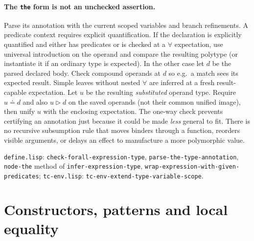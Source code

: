 \documentclass[11pt]{article}
\theoremstyle{definition}
\newcommand{\code}[1]{\texttt{#1}}
\newcommand{\src}[1]{\nolinkurl{#1}}
\newcommand{\eqs}{\doteq}
\newcommand{\oneway}{\mathrel{\triangleright}}
\begin{document}
\paragraph{The \code{the} form is not an unchecked assertion.}
Parse its annotation with the current scoped variables and branch
refinements. A predicate context requires explicit quantification. If
the declaration is explicitly quantified and either has predicates or is
checked at a $\forall$ expectation, use universal introduction on the
operand and compare the resulting
polytype (or instantiate it if an ordinary type is expected). In the
other case let $d$ be the parsed declared body. Check compound operands at
$d$ so e.g.\ a match sees its expected result. Simple leaves without
nested $\forall$ are inferred at a fresh result-capable expectation.
Let $u$ be the resulting \emph{substituted} operand type. Require
$u\eqs d$ and also $u\oneway d$ on the saved operands (not their common
unified image), then unify $u$ with the enclosing expectation. The
one-way check prevents certifying an annotation just because it could be
made \emph{less} general to fit. There is no recursive subsumption rule
that moves binders through a function, reorders visible arguments, or
delays an effect to manufacture a more polymorphic value.

\sources \src{define.lisp}: \src{check-forall-expression-type},
\src{parse-the-type-annotation}, \src{node-the} method of
\src{infer-expression-type}, \src{wrap-expression-with-given-predicates};
\src{tc-env.lisp}: \src{tc-env-extend-type-variable-scope}.

\section{Constructors, patterns and local equality}\label{sec:patterns}
\end{document}
